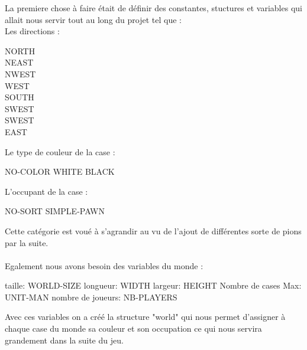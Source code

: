 \documentclass[10pt,a4paper,oneside]{report}
\begin{document}
        La premiere chose à faire était de définir des constantes, stuctures et variables qui allait nous servir tout au long du projet tel que : \\
        Les directions :
        \\
        \begin{center}
        \begin{multicols}{2}
        
            NORTH \\ NEAST  \\ NWEST \\ WEST \\ SOUTH \\ SWEST \\ SWEST \\ EAST  
        
        \end{multicols}
        \end{center} 
        Le type de couleur de la case :
        \begin{center}
            NO-COLOR \hspace{1cm} WHITE \hspace{1cm} BLACK \\
        \end{center}
        L'occupant de la case :
        \begin{center}
            NO-SORT \hspace{2cm} SIMPLE-PAWN \\ 
        \end{center}
        Cette catégorie est voué à s'agrandir au vu de l'ajout de différentes sorte de pions par la suite. \\\\
        Egalement nous avons besoin des variables du monde :
        \begin{center}
            taille: WORLD-SIZE longueur: WIDTH largeur: HEIGHT Nombre de cases Max: UNIT-MAN nombre de joueurs: NB-PLAYERS
        \end{center}
        Avec ces variables on a créé la structure "world" qui nous permet d'assigner à chaque case du monde sa couleur et son occupation ce qui nous servira grandement dans la suite du jeu.\\
\end{document}

